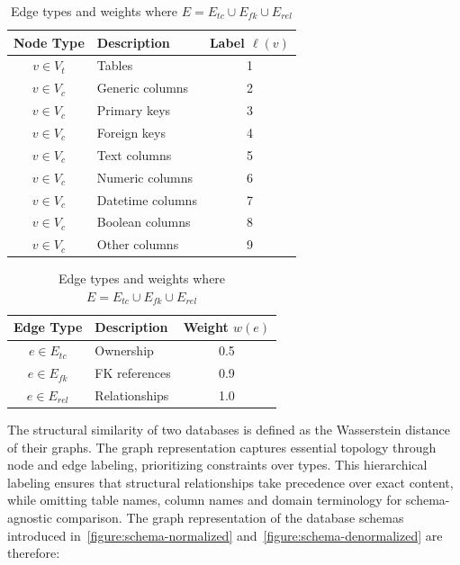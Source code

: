 \begin{table}[ht]
  \hfill
  \begin{minipage}[b]{0.45\linewidth}
    \centering
    \begin{tabular}{clc}
      \hline
      \textbf{Node Type} & \textbf{Description} & \textbf{Label $\ell(v)$} \\
      \hline
      $v \in V_t$ & Tables & 1 \\
      $v \in V_c$ & Generic columns & 2 \\
      $v \in V_c$ & Primary keys & 3 \\
      $v \in V_c$ & Foreign keys & 4 \\
      $v \in V_c$ & Text columns  & 5 \\
      $v \in V_c$ & Numeric columns & 6 \\
      $v \in V_c$ & Datetime columns & 7 \\
      $v \in V_c$ & Boolean columns & 8 \\
      $v \in V_c$ & Other columns & 9 \\
      \hline
    \end{tabular}
    \caption{
      Node types and semantic labels where $V = V_t \cup V_c$ where $V_t$ represents
      table nodes and $V_c$ represents column nodes
    }
    \label{table:nodes}
  \end{minipage}
  \hfill
  \begin{minipage}[b]{0.45\linewidth}
    \centering
    \begin{tabular}{clc}
      \hline
      \textbf{Edge Type} & \textbf{Description} & \textbf{Weight $w(e)$} \\
      \hline
      $e \in E_{tc}$ & Ownership & 0.5 \\
      $e \in E_{fk}$ & FK references & 0.9 \\
      $e \in E_{rel}$ & Relationships & 1.0 \\
      \hline
    \end{tabular}
    \vspace{3.5em}
    \caption{Edge types and weights where $E = E_{tc} \cup E_{fk} \cup E_{rel}$}
    \label{table:edges}
    \vspace{1em}
  \end{minipage}
  \hfill
  \vspace{1em}
\end{table}


The structural similarity of two databases is defined as the Wasserstein
distance of their graphs. The graph representation captures essential
topology through node and edge labeling, prioritizing constraints over
types. This hierarchical labeling ensures that structural relationships
take precedence over exact content, while omitting table names, column names
and domain terminology for schema-agnostic comparison.
The graph representation of the database schemas introduced
in~\ref{figure:schema-normalized} and~\ref{figure:schema-denormalized} are
therefore:

